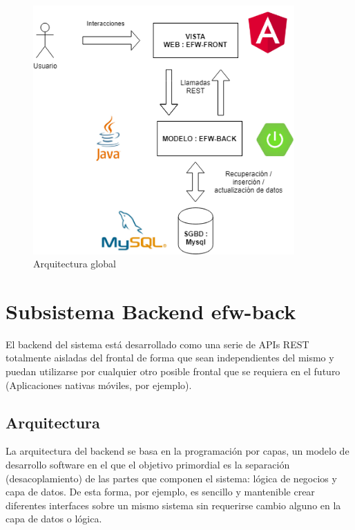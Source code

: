 \documentclass[12pt, a4paper, twoside]{book}
\begin{document}
	\begin{figure}[H]
		\centering
		\includegraphics[width=10cm]{Imagenes/Arquitectura.png}
		\caption{Arquitectura global}\label{Arquitectura global}
	\end{figure}
	
	\section{Subsistema Backend efw-back}
	
	El backend del sistema está desarrollado como una serie de APIs REST totalmente aisladas del frontal de forma que sean independientes del mismo y puedan utilizarse por cualquier otro posible frontal que se requiera en el futuro (Aplicaciones nativas móviles, por ejemplo).
	
	\subsection{Arquitectura}		
	
	La arquitectura del backend se basa en la programación por capas, un modelo de desarrollo software en el que el objetivo primordial es la separación (desacoplamiento) de las partes que componen el sistema: lógica de negocios y capa de datos. De esta forma, por ejemplo, es sencillo y mantenible crear diferentes interfaces sobre un mismo sistema sin requerirse cambio alguno en la capa de datos o lógica.
	
\end{document}
